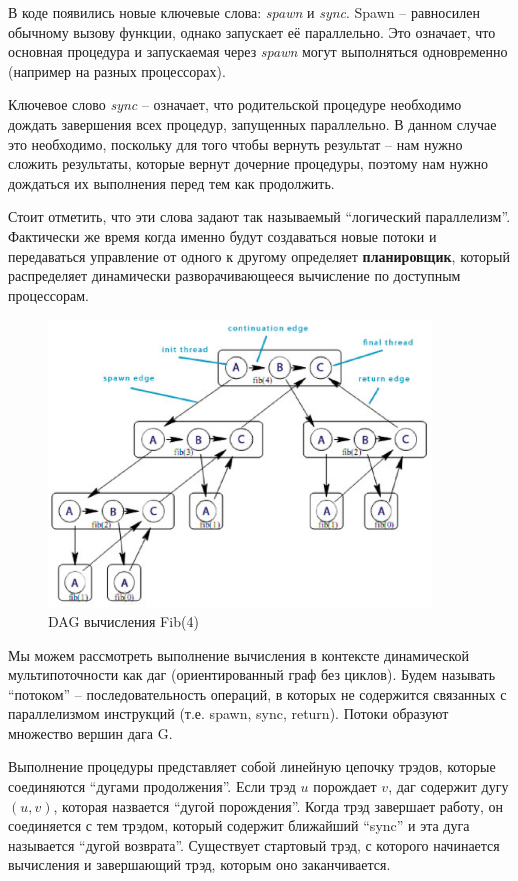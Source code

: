 \documentclass[a4paper,11pt]{article}
\begin{document}
В коде появились новые ключевые слова: \emph{spawn} и \emph{sync}. Spawn --
равносилен обычному вызову функции, однако запускает её параллельно. Это
означает, что основная процедура и запускаемая через \emph{spawn} могут
выполняться одновременно (например на разных процессорах).

Ключевое слово \emph{sync} -- означает, что родительской процедуре необходимо
дождать завершения всех процедур, запущенных параллельно. В данном случае это
необходимо, поскольку для того чтобы вернуть результат -- нам нужно сложить
результаты, которые вернут дочерние процедуры, поэтому нам нужно дождаться их
выполнения перед тем как продолжить.

Стоит отметить, что эти слова задают так называемый ``логический параллелизм''.
Фактически же время когда именно будут создаваться новые потоки и передаваться
управление от одного к другому определяет \textbf{планировщик}, который
распределяет динамически разворачивающееся вычисление по доступным процессорам.

\begin{figure}[ht]
  \centering
  \includegraphics[width=4in]{lecture20/multi-dag.eps}
  \caption{DAG вычисления Fib(4)}
  \label{fig:multi-dag}
\end{figure}

Мы можем рассмотреть выполнение вычисления в контексте динамической
мультипоточности как даг (ориентированный граф без циклов). Будем называть
``потоком'' -- последовательность операций, в которых не содержится связанных с
параллелизмом инструкций (т.е. spawn, sync, return). Потоки образуют множество
вершин дага G.

Выполнение процедуры представляет собой линейную цепочку трэдов, которые
соединяются ``дугами продолжения''. Если трэд $u$ порождает $v$, даг содержит
дугу $(u, v)$, которая назвается ``дугой порождения''. Когда трэд завершает
работу, он соединяется с тем трэдом, который содержит ближайший ``sync'' и эта
дуга называется ``дугой возврата''. Существует стартовый трэд, с которого
начинается вычисления и завершающий трэд, которым оно заканчивается.
\end{document}
